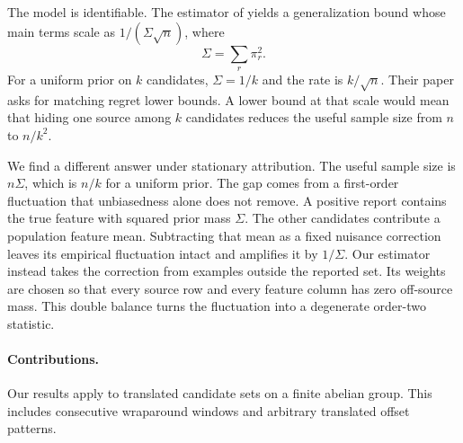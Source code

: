 \documentclass[twoside]{article}
\newcommand{\1}{\mathbf 1}
\begin{document}
The model is identifiable. The estimator of \citet{applebaum2026attribution} yields a generalization bound whose main terms scale as $1/(\Sigma\sqrt n)$, where
\begin{equation}
 \Sigma=\sum_{r}\pi_r^2.
 \label{eq:sigma}
\end{equation}
For a uniform prior on $k$ candidates, $\Sigma=1/k$ and the rate is $k/\sqrt n$. Their paper asks for matching regret lower bounds. A lower bound at that scale would mean that hiding one source among $k$ candidates reduces the useful sample size from $n$ to $n/k^2$.

We find a different answer under stationary attribution. The useful sample size is $n\Sigma$, which is $n/k$ for a uniform prior. The gap comes from a first-order fluctuation that unbiasedness alone does not remove. A positive report contains the true feature with squared prior mass $\Sigma$. The other candidates contribute a population feature mean. Subtracting that mean as a fixed nuisance correction leaves its empirical fluctuation intact and amplifies it by $1/\Sigma$. Our estimator instead takes the correction from examples outside the reported set. Its weights are chosen so that every source row and every feature column has zero off-source mass. This double balance turns the fluctuation into a degenerate order-two statistic.

\paragraph{Contributions.}
Our results apply to translated candidate sets on a finite abelian group. This includes consecutive wraparound windows and arbitrary translated offset patterns.
\end{document}
